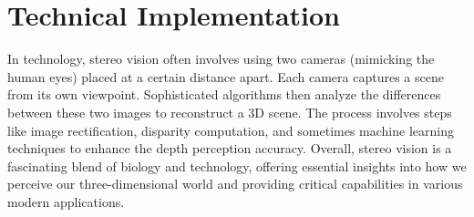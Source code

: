 \documentclass[22pt]{report}
\begin{document}
    \section{Technical Implementation}
        In technology, stereo vision often involves using two cameras (mimicking the human eyes) placed at a certain distance apart. Each camera captures a scene from its own viewpoint. Sophisticated algorithms then analyze the differences between these two images to reconstruct a 3D scene. The process involves steps like image rectification, disparity computation, and sometimes machine learning techniques to enhance the depth perception accuracy.
        Overall, stereo vision is a fascinating blend of biology and technology, offering essential insights into how we perceive our three-dimensional world and providing critical capabilities in various modern applications.
\end{document}
